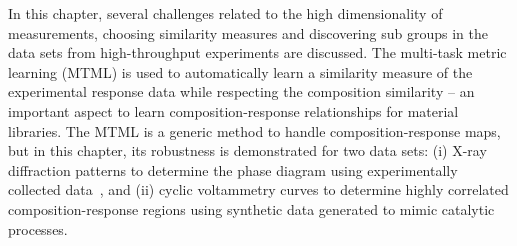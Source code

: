 In this chapter, several challenges related to the high dimensionality of measurements, choosing similarity measures and discovering sub groups in the data sets from high-throughput experiments are discussed.
The multi-task metric learning (MTML) is used to automatically learn a similarity measure of the experimental response data while respecting the composition similarity -- an important aspect to learn composition-response relationships for material libraries.
The MTML is a generic method to handle composition-response maps, but in this chapter, its robustness is demonstrated for two data sets:
(i) X-ray diffraction patterns to determine the phase diagram using experimentally collected data~\cite{long2007rapid}, and
(ii) cyclic voltammetry curves to determine highly correlated composition-response regions using synthetic data generated to mimic catalytic processes. 

